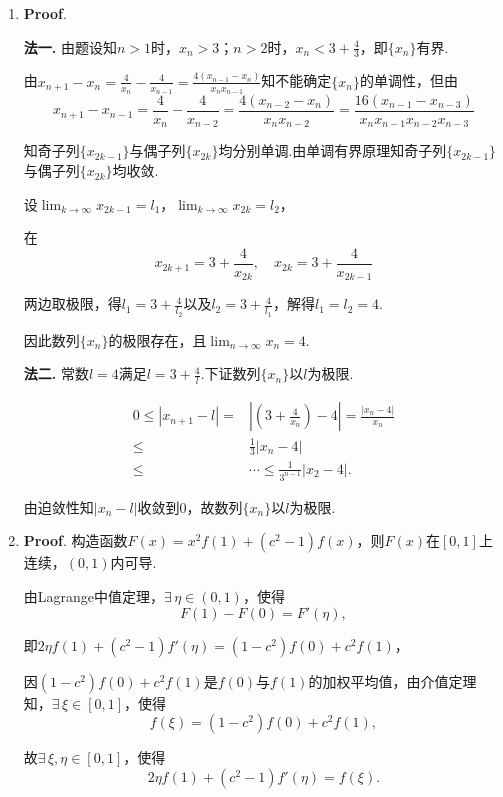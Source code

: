 \documentclass[../Main.tex]{subfiles}
\begin{document}
  \begin{enumerate}
    \item[16.] \textbf{Proof}.

      \textbf{法一.} 由题设知$n>1$时，$x_{n}>3$；$n>2$时，$x_{n}<3+\frac{4}{3}$，即$\{
      x_{n}\}$有界.

      由$x_{n+1}-x_{n}=\frac{4}{x_{n}}-\frac{4}{x_{n-1}}=\frac{4(x_{n-1}-x_{n})}{x_{n}
      x_{n-1}}$知不能确定$\{x_{n}\}$的单调性，但由
      \[
        x_{n+1}-x_{n-1}=\frac{4}{x_{n}}-\frac{4}{x_{n-2}}=\frac{4(x_{n-2}-x_{n})}{x_{n}
        x_{n-2}}=\frac{16(x_{n-1}-x_{n-3})}{x_{n} x_{n-1}x_{n-2}x_{n-3}}
      \]

      知奇子列$\{x_{2k-1}\}$与偶子列$\{x_{2k}\}$均分别单调.由单调有界原理知奇子列$\{
      x_{2k-1}\}$与偶子列$\{x_{2k}\}$均收敛.

      设$\lim_{k\to\infty}x_{2k-1}=l_{1}$，$\lim_{k\to\infty}x_{2k}=l_{2}$，

      在
      \[
        x_{2k+1}=3+\frac{4}{x_{2k}},\quad x_{2k}=3+\frac{4}{x_{2k-1}}
      \]

      两边取极限，得$l_{1}=3+\frac{4}{l_{2}}$以及$l_{2}=3+\frac{4}{l_{1}}$，解得$l
      _{1}=l_{2}=4$.

      因此数列$\{x_{n}\}$的极限存在，且$\lim_{n\to\infty}x_{n}=4$.

      \textbf{法二.} 常数$l=4$满足$l=3+\frac{4}{l}$.下证数列$\{x_{n}\}$以$l$为极限.

      \[
        \begin{aligned}
          0\leq|x_{n+1}-l|= & \left|\left(3+\frac{4}{x_n}\right)-4\right|=\frac{|x_n-4|}{x_n} \\
          \leq              & \frac{1}{3}|x_{n}-4|                                            \\
          \leq              & \cdots \leq \frac{1}{3^{n-1}}|x_{2}-4|.
        \end{aligned}
      \]

      由迫敛性知$|x_{n}-l|$收敛到$0$，故数列$\{x_{n}\}$以$l$为极限.

    \item[17.] \textbf{Proof}. 构造函数$F(x)=x^{2}f(1)+(c^{2}-1)f(x)$，则$F(x)$在$[
      0,1]$上连续，$(0,1)$内可导.

      由Lagrange中值定理，$\exists\,\eta\in(0,1)$，使得
      \[
        F(1)-F(0)=F'(\eta),
      \]

      即$2\eta f(1)+(c^{2}-1)f'(\eta)=(1-c^{2})f(0)+c^{2}f(1)$，

      因$(1-c^{2})f(0)+c^{2} f(1)$是$f(0)$与$f(1)$的加权平均值，由介值定理知，$\exists
      \,\xi\in[0,1]$，使得
      \[
        f(\xi)=(1-c^{2})f(0)+c^{2} f(1),
      \]

      故$\exists\,\xi,\eta\in[0,1]$，使得
      \[
        2\eta f(1)+(c^{2}-1)f'(\eta)=f(\xi).
      \]
  \end{enumerate}
\end{document}

